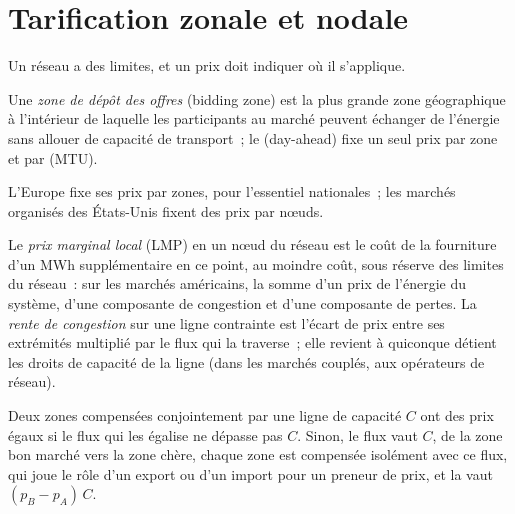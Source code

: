 \section{Tarification zonale et nodale}

Un réseau a des limites, et un prix doit indiquer où il s'applique.

\begin{definition}\label{def:m3:power-markets-design:zone}
Une \emph{zone de dépôt des offres} (bidding zone) est la plus grande zone géographique à l'intérieur de laquelle
les participants au marché peuvent échanger de l'énergie sans allouer de capacité de transport~; le
 (day-ahead) fixe un seul prix par zone et par  (MTU).
\end{definition}

L'Europe fixe ses prix par zones, pour l'essentiel nationales~; les marchés organisés des États-Unis fixent des prix par
nœuds.

\begin{definition}\label{def:m3:power-markets-design:lmp}
Le \emph{prix marginal local} (LMP) en un nœud du
réseau est le coût de la fourniture d'un MWh supplémentaire en ce point, au moindre coût, sous réserve des
limites du réseau~: sur les marchés américains, la somme d'un prix de l'énergie du système,
d'une composante de congestion et d'une composante de pertes. La \emph{rente de congestion} sur une ligne contrainte est
l'écart de prix entre ses extrémités multiplié par le flux qui la traverse~; elle revient à quiconque
détient les droits de capacité de la ligne (dans les marchés couplés, aux opérateurs de réseau).
\end{definition}

\begin{proposition}\label{prop:m3:power-markets-design:twozones}
Deux zones compensées conjointement par une ligne de capacité $C$ ont des prix égaux si le flux
qui les égalise ne dépasse pas $C$. Sinon, le flux vaut $C$, de la zone bon marché vers la
zone chère, chaque zone est compensée isolément avec ce flux, qui joue le rôle d'un export ou d'un import pour un preneur de prix, et
la  vaut $(p_B - p_A)\,C$.
\end{proposition}


